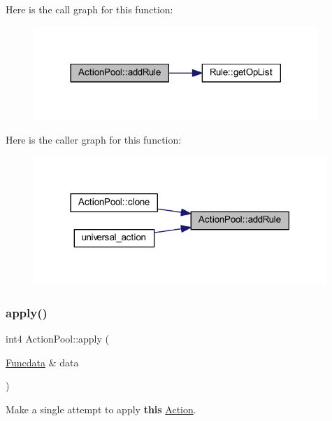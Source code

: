 Here is the call graph for this function\+:
\nopagebreak
\begin{figure}[H]
\begin{center}
\leavevmode
\includegraphics[width=305pt]{class_action_pool_af8879782eac5bfb2cb748dda52760e12_cgraph}
\end{center}
\end{figure}
Here is the caller graph for this function\+:
\nopagebreak
\begin{figure}[H]
\begin{center}
\leavevmode
\includegraphics[width=314pt]{class_action_pool_af8879782eac5bfb2cb748dda52760e12_icgraph}
\end{center}
\end{figure}
\mbox{\label{class_action_pool_ad7b2ba46cad39369c0831cbfcc654802}} 
\subsubsection{\texorpdfstring{apply()}{apply()}}
{\footnotesize\ttfamily int4 Action\+Pool\+::apply (\begin{DoxyParamCaption}\item[{\mbox{\hyperlink{class_funcdata}{Funcdata}} \&}]{data }\end{DoxyParamCaption})\hspace{0.3cm}{\ttfamily [virtual]}}



Make a single attempt to apply {\bfseries{this}} \mbox{\hyperlink{class_action}{Action}}. 


